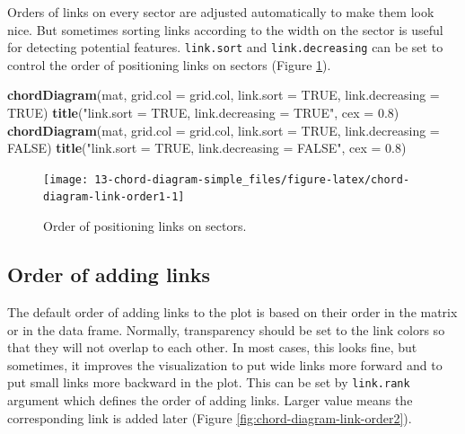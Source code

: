 \documentclass[]{book}
\newenvironment{Shaded}{\begin{snugshade}}{\end{snugshade}}
\newcommand{\KeywordTok}[1]{\textcolor[rgb]{0.13,0.29,0.53}{\textbf{#1}}}
\newcommand{\DataTypeTok}[1]{\textcolor[rgb]{0.13,0.29,0.53}{#1}}
\newcommand{\FloatTok}[1]{\textcolor[rgb]{0.00,0.00,0.81}{#1}}
\newcommand{\StringTok}[1]{\textcolor[rgb]{0.31,0.60,0.02}{#1}}
\newcommand{\OtherTok}[1]{\textcolor[rgb]{0.56,0.35,0.01}{#1}}
\newcommand{\NormalTok}[1]{#1}
\theoremstyle{definition}
\theoremstyle{definition}
\theoremstyle{remark}
\begin{document}
Orders of links on every sector are adjusted automatically to make them
look nice. But sometimes sorting links according to the width on the
sector is useful for detecting potential features. \texttt{link.sort}
and \texttt{link.decreasing} can be set to control the order of
positioning links on sectors (Figure
\ref{fig:chord-diagram-link-order1}).

\begin{Shaded}
\begin{Highlighting}[]
\KeywordTok{chordDiagram}\NormalTok{(mat, }\DataTypeTok{grid.col =}\NormalTok{ grid.col, }\DataTypeTok{link.sort =} \OtherTok{TRUE}\NormalTok{, }\DataTypeTok{link.decreasing =} \OtherTok{TRUE}\NormalTok{)}
\KeywordTok{title}\NormalTok{(}\StringTok{"link.sort = TRUE, link.decreasing = TRUE"}\NormalTok{, }\DataTypeTok{cex =} \FloatTok{0.8}\NormalTok{)}
\KeywordTok{chordDiagram}\NormalTok{(mat, }\DataTypeTok{grid.col =}\NormalTok{ grid.col, }\DataTypeTok{link.sort =} \OtherTok{TRUE}\NormalTok{, }\DataTypeTok{link.decreasing =} \OtherTok{FALSE}\NormalTok{)}
\KeywordTok{title}\NormalTok{(}\StringTok{"link.sort = TRUE, link.decreasing = FALSE"}\NormalTok{, }\DataTypeTok{cex =} \FloatTok{0.8}\NormalTok{)}
\end{Highlighting}
\end{Shaded}

\begin{figure}

{\centering \texttt{[image: 13-chord-diagram-simple\_files/figure-latex/chord-diagram-link-order1-1]} 

}

\caption{Order of positioning links on sectors.}\label{fig:chord-diagram-link-order1}
\end{figure}

\subsection{Order of adding links}\label{order-of-adding-links}

The default order of adding links to the plot is based on their order in
the matrix or in the data frame. Normally, transparency should be set to
the link colors so that they will not overlap to each other. In most
cases, this looks fine, but sometimes, it improves the visualization to
put wide links more forward and to put small links more backward in the
plot. This can be set by \texttt{link.rank} argument which defines the
order of adding links. Larger value means the corresponding link is
added later (Figure \ref{fig:chord-diagram-link-order2}).
\end{document}

